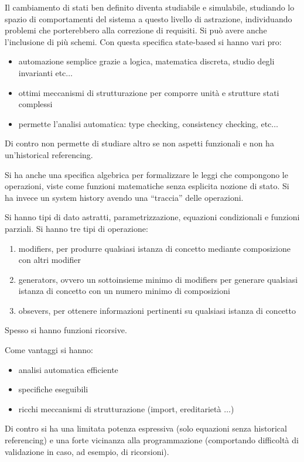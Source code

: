 Il cambiamento di stati ben definito diventa studiabile e simulabile, studiando lo spazio di comportamenti del sistema a questo livello di astrazione, individuando problemi che porterebbero alla correzione di requisiti. Si può avere anche l'inclusione di più schemi. Con questa specifica state-based si hanno vari pro:
\begin{itemize}
\item automazione semplice grazie a logica, matematica discreta, studio degli invarianti etc$\dots$
\item ottimi meccanismi di strutturazione per comporre unità e strutture stati complessi
\item permette l'analisi automatica: type checking, consistency checking, etc$\dots$
\end{itemize}

Di contro non permette di studiare altro se non aspetti funzionali e non ha un'historical referencing.

Si ha anche una specifica algebrica per formalizzare le leggi che compongono le operazioni, viste come funzioni matematiche senza esplicita nozione di stato. Si ha invece un system history avendo una “traccia” delle operazioni.

Si hanno tipi di dato astratti, parametrizzazione, equazioni condizionali e funzioni parziali. Si hanno tre tipi di operazione:
\begin{enumerate}
\item modifiers, per produrre qualsiasi istanza di concetto mediante composizione con altri modifier
\item generators, ovvero un sottoinsieme minimo di modifiers per generare qualsiasi istanza di concetto con un numero minimo di composizioni
\item obsevers, per ottenere informazioni pertinenti su qualsiasi istanza di concetto
\end{enumerate}

Spesso si hanno funzioni ricorsive.

Come vantaggi si hanno:
\begin{itemize}
\item analisi automatica efficiente
\item specifiche eseguibili
\item ricchi meccanismi di strutturazione (import, ereditarietà $\dots$)
\end{itemize}

Di contro si ha una limitata potenza espressiva (solo equazioni senza historical referencing) e una forte vicinanza alla programmazione (comportando difficoltà di validazione in caso, ad esempio, di ricorsioni).


